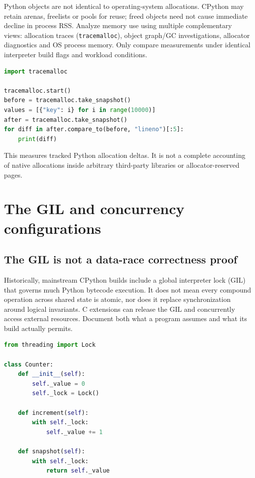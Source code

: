\documentclass[
  11pt,
]{report}
\newcommand{\passthrough}[1]{#1}
\begin{document}
Python objects are not identical to operating-system allocations.
CPython may retain arenas, freelists or pools for reuse; freed objects
need not cause immediate decline in process RSS. Analyze memory use
using multiple complementary views: allocation traces
(\passthrough{\lstinline!tracemalloc!}), object graph/GC investigations,
allocator diagnostics and OS process memory. Only compare measurements
under identical interpreter build flags and workload conditions.

\begin{lstlisting}[language=Python]
import tracemalloc

tracemalloc.start()
before = tracemalloc.take_snapshot()
values = [{"key": i} for i in range(10000)]
after = tracemalloc.take_snapshot()
for diff in after.compare_to(before, "lineno")[:5]:
    print(diff)
\end{lstlisting}

This measures tracked Python allocation deltas. It is not a complete
accounting of native allocations inside arbitrary third-party libraries
or allocator-reserved pages.

\chapter{The GIL and concurrency
configurations}\label{the-gil-and-concurrency-configurations}

\section{The GIL is not a data-race correctness
proof}\label{the-gil-is-not-a-data-race-correctness-proof}

Historically, mainstream CPython builds include a global interpreter
lock (GIL) that governs much Python bytecode execution. It does not mean
every compound operation across shared state is atomic, nor does it
replace synchronization around logical invariants. C extensions can
release the GIL and concurrently access external resources. Document
both what a program assumes and what its build actually permits.

\begin{lstlisting}[language=Python]
from threading import Lock

class Counter:
    def __init__(self):
        self._value = 0
        self._lock = Lock()

    def increment(self):
        with self._lock:
            self._value += 1

    def snapshot(self):
        with self._lock:
            return self._value
\end{lstlisting}
\end{document}
